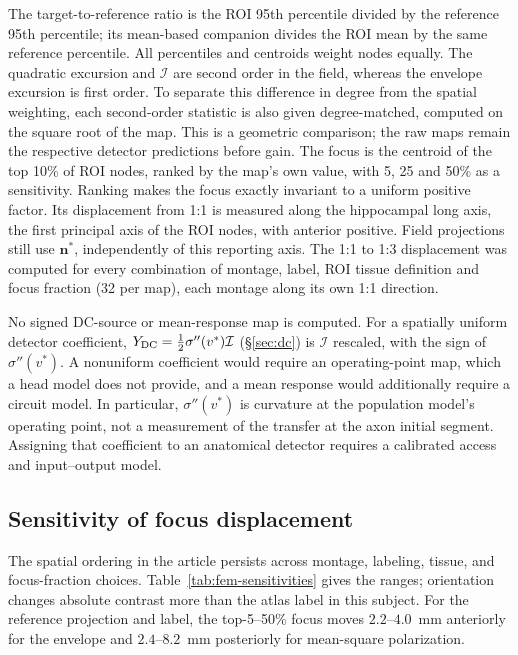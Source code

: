 \documentclass[11pt,a4paper]{article}
\newcommand{\Sig}{\sigma}
\begin{document}
The target-to-reference ratio is the ROI 95th percentile divided by the reference
95th percentile; its mean-based companion divides the ROI mean by the same
reference percentile. All percentiles and centroids weight nodes equally.
The quadratic excursion and $\mathcal I$ are second order in the field, whereas
the envelope excursion is first order. To separate this difference in degree
from the spatial weighting, each second-order statistic is also given
degree-matched, computed on the square root of the map. This is a geometric
comparison; the raw maps remain the respective detector predictions before gain.
The focus is the centroid of the top 10\% of ROI nodes,
ranked by the map's own value, with 5, 25 and 50\% as a sensitivity. Ranking makes the
focus exactly invariant to a uniform positive factor. Its displacement from 1:1 is
measured along the hippocampal long axis, the first principal axis of the ROI nodes,
with anterior positive. Field projections still use $\mathbf n^*$, independently
of this reporting axis. The 1:1 to 1:3 displacement was computed for every combination
of montage, label, ROI tissue definition and focus fraction (32 per map), each montage
along its own 1:1 direction.

No signed DC-source or mean-response map is computed. For a spatially uniform detector
coefficient, $Y_{\rm DC}=\tfrac12\Sig''(v^*)\mathcal I$ (\S\ref{sec:dc}) is
$\mathcal I$ rescaled, with the sign of $\Sig''(v^*)$. A nonuniform coefficient would
require an operating-point map, which a head model does not provide, and a mean
response would additionally require a circuit model. In particular,
$\Sig''(v^*)$ is curvature at the population model's operating point, not a
measurement of the transfer at the axon initial segment. Assigning that
coefficient to an anatomical detector requires a calibrated access and
input--output model.

\subsection{Sensitivity of focus displacement}\label{supp:fem-sensitivities}
The spatial ordering in the article persists across montage, labeling, tissue,
and focus-fraction choices. Table~\ref{tab:fem-sensitivities} gives the ranges;
orientation changes absolute contrast more than the atlas label in this subject.
For the reference projection and label, the top-5--50\% focus moves
$2.2$--$4.0$~mm anteriorly for the envelope and $2.4$--$8.2$~mm posteriorly
for mean-square polarization.
\end{document}
